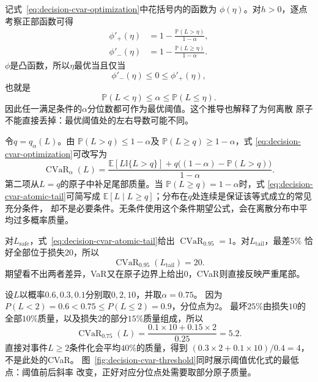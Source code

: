 记式~\eqref{eq:decision-cvar-optimization}中花括号内的函数为
\(\phi(\eta)\)。对\(h>0\)，逐点考察正部函数可得
\begin{align*}
  \phi'_+(\eta)
  &=
  1-\frac{\mathbb{P}(L>\eta)}{1-\alpha},\\
  \phi'_-(\eta)
  &=
  1-\frac{\mathbb{P}(L\geq\eta)}{1-\alpha}.
\end{align*}
\(\phi\)是凸函数，所以\(\eta\)最优当且仅当
\[
  \phi'_-(\eta)\leq0\leq\phi'_+(\eta),
\]
也就是
\begin{equation}
  \mathbb{P}(L<\eta)
  \leq\alpha
  \leq
  \mathbb{P}(L\leq\eta).
  \label{eq:decision-cvar-quantile-condition}
\end{equation}
因此任一满足条件的\(\alpha\)分位数都可作为最优阈值。这个推导也解释了为何离散
原子不能直接丢掉：最优阈值处的左右导数可能不同。

令\(q=q_\alpha(L)\)。由
\(\mathbb{P}(L>q)\leq1-\alpha\)及
\(\mathbb{P}(L\geq q)\geq1-\alpha\)，式
\eqref{eq:decision-cvar-optimization}可改写为
\begin{equation}
  \operatorname{CVaR}_{\alpha}(L)
  =
  \frac{
    \mathbb{E}[L\mathbb{I}\{L>q\}]
    +
    q\bigl((1-\alpha)-\mathbb{P}(L>q)\bigr)
  }{1-\alpha}.
  \label{eq:decision-cvar-atomic-tail}
\end{equation}
第二项从\(L=q\)的原子中补足尾部质量。当
\(\mathbb{P}(L\geq q)=1-\alpha\)时，式
\eqref{eq:decision-cvar-atomic-tail}可简写成
\(\mathbb{E}[L\mid L\geq q]\)；分布在\(q\)处连续是保证该等式成立的常见充分条件，
却不是必要条件。无条件使用这个条件期望公式，会在离散分布中平均过多概率质量。

对\(L_{\mathrm{safe}}\)，式~\eqref{eq:decision-cvar-atomic-tail}给出
\(\operatorname{CVaR}_{0.95}=1\)。对\(L_{\mathrm{tail}}\)，最差\(5\%\)
恰好全部位于损失\(20\)，所以
\[
  \operatorname{CVaR}_{0.95}(L_{\mathrm{tail}})=20.
\]
期望看不出两者差异，VaR又在原子边界上给出\(0\)，CVaR则直接反映严重尾部。

\begin{example}[分位点原子中的部分尾部]
  \label{ex:decision-cvar-partial-atom}
  设$L$以概率$0.6,0.3,0.1$分别取$0,2,10$，并取$\alpha=0.75$。
  因为$P(L<2)=0.6<0.75\leq P(L\leq2)=0.9$，分位点为$2$。
  最坏$25\%$由损失$10$的全部$10\%$质量，以及损失$2$的部分$15\%$质量组成，所以
  \[
    \operatorname{CVaR}_{0.75}(L)
    =\frac{0.1\times10+0.15\times2}{0.25}=5.2.
  \]
  直接对事件$L\geq2$条件化会平均$40\%$的质量，得到
  $(0.3\times2+0.1\times10)/0.4=4$，不是此处的CVaR。
  图~\ref{fig:decision-cvar-threshold}同时展示阈值优化式的最低点：阈值前后斜率
  改变，正好对应分位点处需要取部分原子质量。
\end{example}

